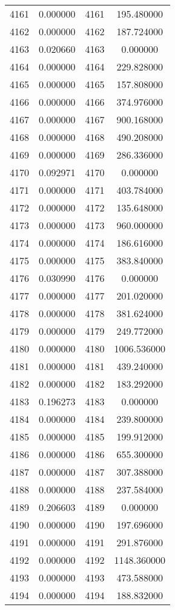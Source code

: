 \documentclass[12pt]{article}
\begin{document}
\begin{longtable}{@{}cccc@{}}
4161 & 0.000000 & 4161 & 195.480000 \\
4162 & 0.000000 & 4162 & 187.724000 \\
4163 & 0.020660 & 4163 & 0.000000 \\
4164 & 0.000000 & 4164 & 229.828000 \\
4165 & 0.000000 & 4165 & 157.808000 \\
4166 & 0.000000 & 4166 & 374.976000 \\
4167 & 0.000000 & 4167 & 900.168000 \\
4168 & 0.000000 & 4168 & 490.208000 \\
4169 & 0.000000 & 4169 & 286.336000 \\
4170 & 0.092971 & 4170 & 0.000000 \\
4171 & 0.000000 & 4171 & 403.784000 \\
4172 & 0.000000 & 4172 & 135.648000 \\
4173 & 0.000000 & 4173 & 960.000000 \\
4174 & 0.000000 & 4174 & 186.616000 \\
4175 & 0.000000 & 4175 & 383.840000 \\
4176 & 0.030990 & 4176 & 0.000000 \\
4177 & 0.000000 & 4177 & 201.020000 \\
4178 & 0.000000 & 4178 & 381.624000 \\
4179 & 0.000000 & 4179 & 249.772000 \\
4180 & 0.000000 & 4180 & 1006.536000 \\
4181 & 0.000000 & 4181 & 439.240000 \\
4182 & 0.000000 & 4182 & 183.292000 \\
4183 & 0.196273 & 4183 & 0.000000 \\
4184 & 0.000000 & 4184 & 239.800000 \\
4185 & 0.000000 & 4185 & 199.912000 \\
4186 & 0.000000 & 4186 & 655.300000 \\
4187 & 0.000000 & 4187 & 307.388000 \\
4188 & 0.000000 & 4188 & 237.584000 \\
4189 & 0.206603 & 4189 & 0.000000 \\
4190 & 0.000000 & 4190 & 197.696000 \\
4191 & 0.000000 & 4191 & 291.876000 \\
4192 & 0.000000 & 4192 & 1148.360000 \\
4193 & 0.000000 & 4193 & 473.588000 \\
4194 & 0.000000 & 4194 & 188.832000 \\

\end{longtable}
\end{document}
